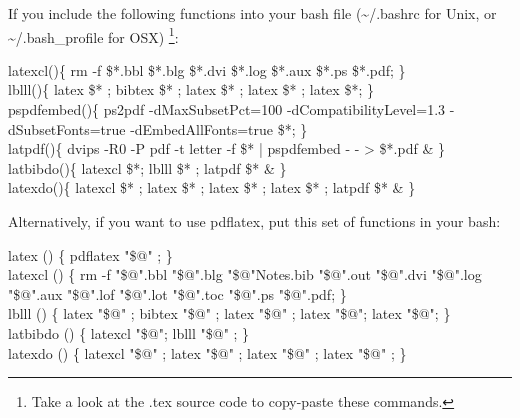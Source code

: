 If you include the following functions into your bash file
(\sim/.bashrc for Unix, or \sim/.bash\_profile for OSX)%
\footnote{Take a look at the .tex source code to copy-paste these
  commands.}: \newline

\footnotesize \noindent
latexcl()\{ rm -f \$*.bbl \$*.blg \$*.dvi \$*.log \$*.aux \$*.ps \$*.pdf; \} \\
lblll()\{ latex \$* ; bibtex \$* ; latex \$* ; latex \$* ; latex \$*; \} \\
pspdfembed()\{ ps2pdf -dMaxSubsetPct=100 -dCompatibilityLevel=1.3 -dSubsetFonts=true -dEmbedAllFonts=true \$*; \} \\
latpdf()\{ dvips -R0 -P pdf -t letter -f \$* | pspdfembed - - > \$*.pdf \& \} \\
latbibdo()\{ latexcl \$*; lblll \$* ; latpdf \$* \& \} \\
latexdo()\{ latexcl \$* ; latex \$* ; latex \$* ; latex \$* ; latpdf \$* \& \} \\
\normalsize


Alternatively, if you want to use pdflatex, put this set of functions
in your bash:

\footnotesize
latex () \{ pdflatex "\$@" ; \}\\
latexcl () \{ rm -f "\$@".bbl "\$@".blg "\$@"Notes.bib "\$@".out "\$@".dvi "\$@".log "\$@".aux "\$@".lof "\$@".lot "\$@".toc "\$@".ps "\$@".pdf; \} \\
lblll () \{ latex "\$@" ; bibtex "\$@" ; latex "\$@" ; latex "\$@"; latex "\$@"; \}\\
latbibdo () \{ latexcl "\$@"; lblll "\$@" ; \}\\
latexdo () \{ latexcl "\$@" ; latex "\$@" ; latex "\$@" ; latex "\$@" ; \}\\
\normalsize

